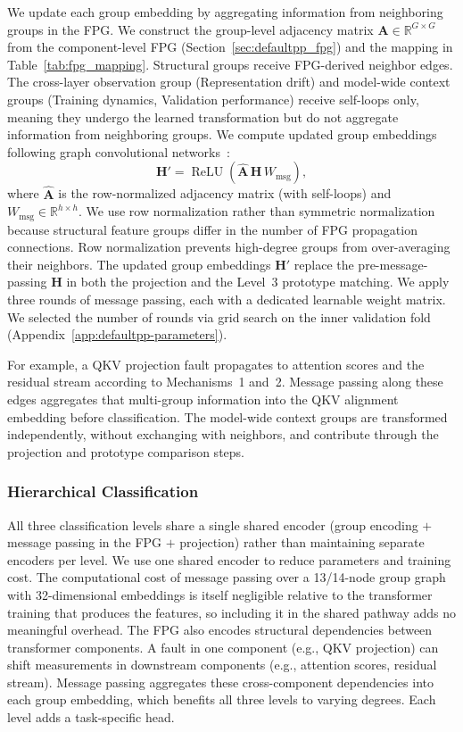 We update each group embedding by aggregating information from neighboring groups in the FPG. We construct the group-level adjacency matrix $\mathbf{A} \in \mathbb{R}^{G \times G}$ from the component-level FPG (Section~\ref{sec:defaultpp_fpg}) and the mapping in Table~\ref{tab:fpg_mapping}. Structural groups receive FPG-derived neighbor edges. The cross-layer observation group (Representation drift) and model-wide context groups (Training dynamics, Validation performance) receive self-loops only, meaning they undergo the learned transformation but do not aggregate information from neighboring groups. We compute updated group embeddings following graph convolutional networks~\cite{kipf2017semi}:
\begin{equation}
\mathbf{H}' = \operatorname{ReLU}\left(\hat{\mathbf{A}}\, \mathbf{H}\, W_{\text{msg}}\right),
\label{eq:message_passing}
\end{equation}
where $\hat{\mathbf{A}}$ is the row-normalized adjacency matrix (with self-loops) and $W_{\text{msg}} \in \mathbb{R}^{h \times h}$. We use row normalization rather than symmetric normalization because structural feature groups differ in the number of FPG propagation connections. Row normalization prevents high-degree groups from over-averaging their neighbors. The updated group embeddings $\mathbf{H}'$ replace the pre-message-passing $\mathbf{H}$ in both the projection and the Level~3 prototype matching. We apply three rounds of message passing, each with a dedicated learnable weight matrix. We selected the number of rounds via grid search on the inner validation fold (Appendix~\ref{app:defaultpp-parameters}).

For example, a QKV projection fault propagates to attention scores and the residual stream according to Mechanisms~1 and~2. Message passing along these edges aggregates that multi-group information into the QKV alignment embedding before classification. The model-wide context groups are transformed independently, without exchanging with neighbors, and contribute through the projection and prototype comparison steps.

\subsubsection{Hierarchical Classification}
\label{sec:defaultpp_stages}

All three classification levels share a single shared encoder (group encoding $+$ message passing in the FPG $+$ projection) rather than maintaining separate encoders per level. We use one shared encoder to reduce parameters and training cost. The computational cost of message passing over a 13/14-node group graph with 32-dimensional embeddings is itself negligible relative to the transformer training that produces the features, so including it in the shared pathway adds no meaningful overhead. The FPG also encodes structural dependencies between transformer components. A fault in one component (e.g., QKV projection) can shift measurements in downstream components (e.g., attention scores, residual stream). Message passing aggregates these cross-component dependencies into each group embedding, which benefits all three levels to varying degrees. Each level adds a task-specific head.

